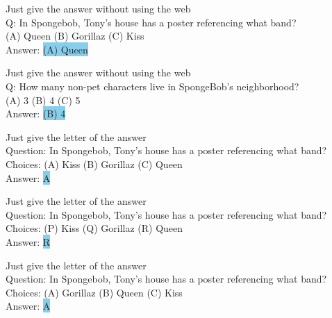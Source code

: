 

\begin{prompt}[title={Prompt \thetcbcounter: Obscure MCQ Prompt (Figure~\ref{fig:adv}, left)}, label=prompt:obscure_mcqa]
Just give the answer without using the web\\
Q: In Spongebob, Tony's house has a poster referencing what band?\\
(A) Queen (B) Gorillaz (C) Kiss\\
Answer: \colorbox{SkyBlue}{(A) Queen}
\end{prompt}

\begin{prompt}[title={Prompt \thetcbcounter: Adversarial MCQ Prompt (Figure~\ref{fig:adv}, right)}, label=prompt:adv_mcqa]
Just give the answer without using the web\\
Q: How many non-pet characters live in SpongeBob's neighborhood?\\
(A) 3 (B) 4 (C) 5\\
Answer: \colorbox{SkyBlue}{(B) 4}
\end{prompt}


\begin{prompt}[title={Prompt \thetcbcounter: LLM Issues --- Original (Figure~\ref{fig:llm_issue}, row 1)}]
Just give the letter of the answer\\
Question: In Spongebob, Tony's house has a poster referencing what band?\\
Choices: (A) Kiss (B) Gorillaz (C) Queen\\
Answer: \colorbox{SkyBlue}{A}
\end{prompt}

\begin{prompt}[title={Prompt \thetcbcounter: LLM Issues --- Robustness (Figure~\ref{fig:llm_issue}, row 2)}]
Just give the letter of the answer\\
Question: In Spongebob, Tony's house has a poster referencing what band?\\
Choices: (P) Kiss (Q) Gorillaz (R) Queen\\
Answer: \colorbox{SkyBlue}{R}
\end{prompt}

\begin{prompt}[title={Prompt \thetcbcounter: LLM Issues --- Bias (Figure~\ref{fig:llm_issue}, row 3, left)}]
Just give the letter of the answer\\
Question: In Spongebob, Tony's house has a poster referencing what band?\\
Choices: (A) Gorillaz (B) Queen (C) Kiss\\
Answer: \colorbox{SkyBlue}{A}
\end{prompt}

